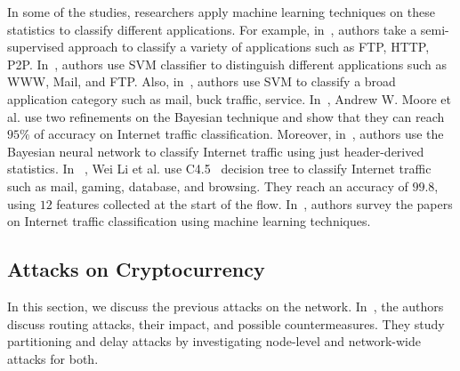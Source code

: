 In some of the studies, researchers apply machine learning techniques on these statistics to classify different applications.
For example, in~\cite{semi}, authors take a semi-supervised approach to classify a variety of applications such as FTP, HTTP, P2P.%
In~\cite{trafficClassSVM,svm2}, authors use SVM classifier to distinguish different applications such as WWW, Mail, and FTP. Also, in~\cite{svm2}, authors use SVM to classify a broad application category such as mail, buck traffic, service. %
In~\cite{MooreZ05}, Andrew W. Moore et al. use two refinements on the Bayesian technique and show that they can reach $95\%$ of accuracy on Internet traffic classification. Moreover, in~\cite{bays2}, authors use the Bayesian neural network to classify Internet traffic using just header-derived statistics. %
 In ~\cite{mlEffi}, Wei Li et al. use C4.5~\cite{tree} decision tree to classify Internet traffic such as mail, gaming, database, and browsing. They reach an accuracy of $99.8$, using $12$ features collected at the start of the flow.
  In~\cite{survey_ml,myth}, authors survey the papers on Internet traffic classification using machine learning techniques. 
 

  \subsection{Attacks on \bc Cryptocurrency}
 In this section, we discuss the previous attacks on the \bc network. 
 In~\cite{hijack}, the authors discuss routing attacks, their impact, and possible countermeasures. They study partitioning and delay attacks by investigating node-level and network-wide attacks for both. %
 
